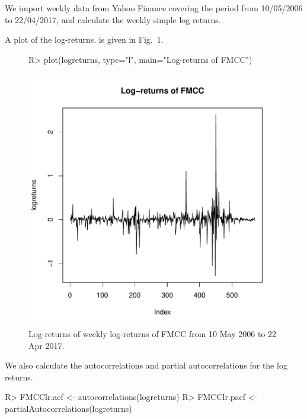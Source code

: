 \documentclass[article,nojss]{jss}
\begin{document}
We import weekly data from Yahoo Finance covering the period from
10/05/2006 to 22/04/2017, and calculate the weekly simple log returns.
\begin{Schunk}
\end{Schunk}
A plot of the log-returns. is given in Fig.~1.
\begin{figure}[ht]
  \centering
\begin{Schunk}
\begin{Sinput}
R> plot(logreturns, type="l", main="Log-returns of FMCC")
\end{Sinput}
\end{Schunk}
\includegraphics{garch_tests_example-004}
\caption{Log-returns of weekly log-returns of FMCC from 10 May 2006 to 22 Apr 2017.}
\end{figure}
We also calculate the autocorrelations and partial autocorrelations for the log returns.
\begin{Schunk}
\begin{Sinput}
R> FMCClr.acf <- autocorrelations(logreturns)
R> FMCClr.pacf <- partialAutocorrelations(logreturns)
\end{Sinput}
\end{Schunk}
\end{document}
